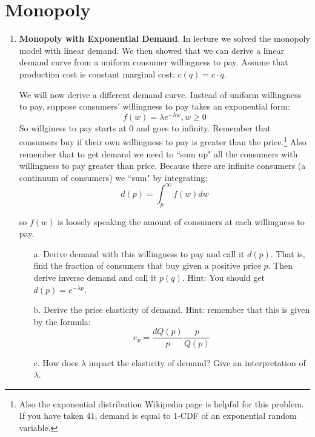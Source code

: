 \documentclass{article}
\begin{document}
\section{Monopoly}
\begin{enumerate}
    \item \textbf{Monopoly with Exponential Demand}. In lecture we solved the monopoly model with linear demand. We then showed that we can derive a linear demand curve from a uniform consumer willingness to pay. Assume that production cost is constant marginal cost: $c(q)=c\cdot q$. 
    
    We will now derive a different demand curve. Instead of uniform willingness to pay, suppose consumers' willingness to pay takes an exponential form:
    \[f(w) = \lambda e^{-\lambda w}, w\geq 0\]
    So willginess to pay starts at 0 and goes to infinity. Remember that consumers buy if their own willingness to pay is greater than the price.\footnote{ Also the exponential distribution Wikipedia page is helpful for this problem. If you have taken 41, demand is equal to 1-CDF of an exponential random variable.} Also remember that to get demand we need to ``sum up" all the consumers with willingness to pay greater than price. Because there are infinite consumers (a continuum of consumers) we ``sum" by integrating:
    \[d(p) = \int_p^{\infty} f(w)dw\]
    
    so $f(w)$ is loosely speaking the amount of consumers at each willingness to pay.
    
    \begin{enumerate}
        \item[a.] Derive demand with this willingness to pay and call it $d(p)$. That is, find the fraction of consumers that buy given a positive price $p$. Then derive inverse demand and call it $p(q)$. Hint: You should get $d(p)=e^{-\lambda p}$.
        
        \vspace{4cm}
        
        \item[b.] Derive the price elasticity of demand. Hint: remember that this is given by the formula:
        \[e_p = \frac{d Q(p)}{p} \frac{p}{Q(p)}\]
        \vspace{2cm}
        
        \item[c.] How does $\lambda$ impact the elasticity of demand? Give an interpretation of $\lambda$.
        
        \vspace{2cm}
        

\end{enumerate}
\end{enumerate}
\end{document}
